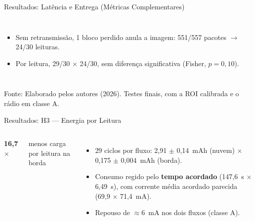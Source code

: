 \documentclass[
    aspectratio=169,
    11pt,
    brazil
]{beamer}
\newcommand{\bignum}[3][senacblue]{%
  \begin{minipage}[t]{\linewidth}\centering
    {\fontsize{22}{24}\selectfont\bfseries\color{#1}#2\par}
    \vspace{2pt}
    {\scriptsize\color{black!70}#3\par}
  \end{minipage}}
\newcommand{\fonteslide}[1]{\par\vfill{\tiny\color{black!60}#1\par}}
\begin{document}
\begin{frame}{Resultados: Latência e Entrega (Métricas Complementares)}
\begin{columns}[t]
    \begin{itemize}\scriptsize
      \setlength{\itemsep}{1pt}
      \item Sem retransmissão, 1 bloco perdido anula a imagem: 551/557 pacotes $\rightarrow$ 24/30 leituras.
      \item Por leitura, 29/30 $\times$ 24/30, sem diferença significativa (Fisher, $p = 0{,}10$).
    \end{itemize}
  \end{columns}
  \fonteslide{Fonte: Elaborado pelos autores (2026). Testes finais, com a ROI calibrada e o rádio em classe A.}
\end{frame}

\begin{frame}{Resultados: H3 --- Energia por Leitura}
  \begin{columns}[c]
    \centering
    \bignum[corBorda]{16,7$\times$}{menos carga por leitura na borda}
    \vspace{0.1cm}
    \begin{itemize}\scriptsize
      \setlength{\itemsep}{2pt}
      \item 29 ciclos por fluxo: 2,91 $\pm$ 0,14~mAh (nuvem) $\times$ 0,175 $\pm$ 0,004~mAh (borda).
      \item Consumo regido pelo \textbf{tempo acordado} (147,6~s $\times$ 6,49~s), com corrente média acordado parecida (69,9 $\times$ 71,4~mA).
      \item Repouso de $\approx$6~mA nos dois fluxos (classe A).
    \end{itemize}
  \end{columns}
\end{frame}
\end{document}

